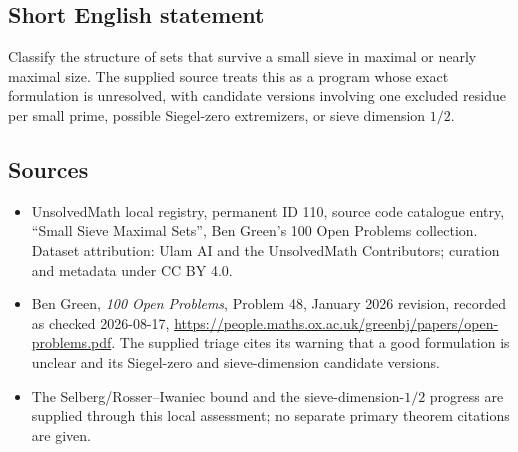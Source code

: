 \documentclass[11pt]{article}
\begin{document}
\subsection{Short English statement}
Classify the structure of sets that survive a small sieve in maximal or nearly maximal size. The supplied source treats this as a program whose exact formulation is unresolved, with candidate versions involving one excluded residue per small prime, possible Siegel-zero extremizers, or sieve dimension $1/2$.
\subsection{Sources}
\begin{itemize}
\item UnsolvedMath local registry, permanent ID 110, source code catalogue entry, ``Small Sieve Maximal Sets'', Ben Green's 100 Open Problems collection. Dataset attribution: Ulam AI and the UnsolvedMath Contributors; curation and metadata under CC BY 4.0.
\item Ben Green, \emph{100 Open Problems}, Problem 48, January 2026 revision, recorded as checked 2026-08-17, \url{https://people.maths.ox.ac.uk/greenbj/papers/open-problems.pdf}. The supplied triage cites its warning that a good formulation is unclear and its Siegel-zero and sieve-dimension candidate versions.
\item The Selberg/Rosser--Iwaniec bound and the sieve-dimension-$1/2$ progress are supplied through this local assessment; no separate primary theorem citations are given.
\end{itemize}
\end{document}
